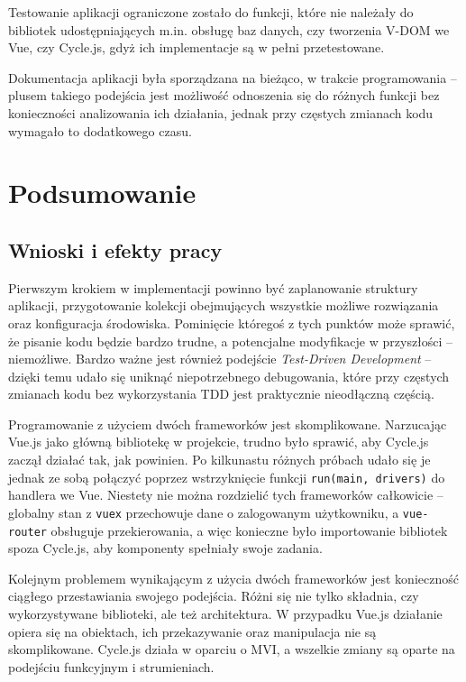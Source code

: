 \documentclass[shortabstract]{iithesis}
\theoremstyle{definition} \newtheorem{definition}{Definicja}[]
\theoremstyle{remark} \newtheorem{remark}[definition]{Observation}
\theoremstyle{plain} \newtheorem{theorem}[definition]{Theorem}
\theoremstyle{plain} \newtheorem{lemma}[definition]{Lemma}
\begin{document}
Testowanie aplikacji ograniczone zostało do funkcji, które nie należały do bibliotek udostępniających m.in. obsługę baz danych, czy tworzenia V-DOM we Vue, czy Cycle.js, gdyż ich implementacje są w pełni przetestowane.

Dokumentacja aplikacji była sporządzana na bieżąco, w trakcie programowania -- plusem takiego podejścia jest możliwość odnoszenia się do różnych funkcji bez konieczności analizowania ich działania, jednak przy częstych zmianach kodu wymagało to dodatkowego czasu.

\chapter{Podsumowanie}
\section{Wnioski i efekty pracy}
Pierwszym krokiem w implementacji powinno być zaplanowanie struktury aplikacji, przygotowanie kolekcji obejmujących wszystkie możliwe rozwiązania oraz konfiguracja środowiska. Pominięcie któregoś z tych punktów może sprawić, że pisanie kodu będzie bardzo trudne, a potencjalne modyfikacje w przyszłości -- niemożliwe. Bardzo ważne jest również podejście \textit{Test-Driven Development} -- dzięki temu udało się uniknąć niepotrzebnego debugowania, które przy częstych zmianach kodu bez wykorzystania TDD jest praktycznie nieodłączną częścią.

Programowanie z użyciem dwóch frameworków jest skomplikowane. Narzucając Vue.js jako główną bibliotekę w projekcie, trudno było sprawić, aby Cycle.js zaczął działać tak, jak powinien. Po kilkunastu różnych próbach udało się je jednak ze sobą połączyć poprzez wstrzyknięcie funkcji \texttt{run(main, drivers)} do handlera we Vue. Niestety nie można rozdzielić tych frameworków całkowicie -- globalny stan z \texttt{vuex} przechowuje dane o zalogowanym użytkowniku, a \texttt{vue-router} obsługuje przekierowania, a więc konieczne było importowanie bibliotek spoza Cycle.js, aby komponenty spełniały swoje zadania.

Kolejnym problemem wynikającym z użycia dwóch frameworków jest konieczność ciągłego przestawiania swojego podejścia. Różni się nie tylko składnia, czy wykorzystywane biblioteki, ale też architektura. W przypadku Vue.js działanie opiera się na obiektach, ich przekazywanie oraz manipulacja nie są skomplikowane. Cycle.js działa w oparciu o MVI, a wszelkie zmiany są oparte na podejściu funkcyjnym i strumieniach.
\end{document}
